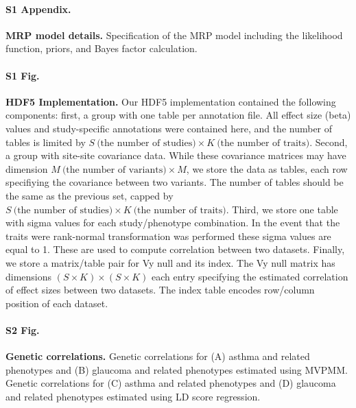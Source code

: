 \paragraph*{S1 Appendix.}
\label{S1_Appendix}
{\bf MRP model details.} Specification of the MRP model including the likelihood function, priors, and Bayes factor calculation.

\paragraph*{S1 Fig.}
\label{hdf5_fig}
{\bf HDF5 Implementation.} Our HDF5 implementation contained the following components: first, a group with one table per annotation file. All effect size (beta) values and study-specific annotations were contained here, and the number of tables is limited by $S\ \textrm{(the number of studies)} \times K\ \textrm{(the number of traits)}$. Second, a group with site-site covariance data. While these covariance matrices may have dimension $M\ \textrm{(the number of variants)} \times M$, we store the data as tables, each row specifiying the covariance between two variants. The number of tables should be the same as the previous set, capped by $S\ \textrm{(the number of studies)} \times K\ \textrm{(the number of traits)}$. Third, we store one table with sigma values for each study/phenotype combination. In the event that the traits were rank-normal transformation was performed these sigma values are equal to 1. These are used to compute correlation between two datasets. Finally, we store a matrix/table pair for Vy null and its index. The Vy null matrix has dimensions $ (S \times K) \times (S \times K)$ each entry specifying the estimated correlation of effect sizes between two datasets. The index table encodes row/column position of each dataset.

\paragraph*{S2 Fig.}
\label{gcorr_fig}
{\bf Genetic correlations.} Genetic correlations for (A) asthma and related phenotypes and (B) glaucoma and related phenotypes estimated using MVPMM. Genetic correlations for (C) asthma and related phenotypes and (D) glaucoma and related phenotypes estimated using LD score regression.

